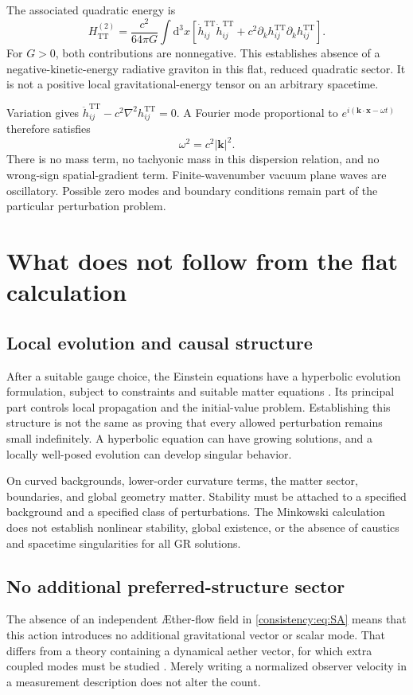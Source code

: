 \documentclass[11pt,oneside]{report}
\newcommand{\Aflow}{\AE{}ther-flow}
\newcommand{\TT}{\mathrm{TT}}
\newcommand{\dd}{\mathrm d}
\theoremstyle{remark}
\numberwithin{definition}{chapter}
\numberwithin{proposition}{chapter}
\numberwithin{remark}{chapter}
\begin{document}
The associated quadratic energy is
\begin{equation}
H_{\TT}^{(2)}=\frac{c^2}{64\pi G}\int\dd^3x\left[
\dot h^{\TT}_{ij}\dot h^{\TT}_{ij}
+c^2\partial_kh^{\TT}_{ij}\partial_kh^{\TT}_{ij}\right].
\end{equation}
For $G>0$, both contributions are nonnegative. This establishes absence of a negative-kinetic-energy radiative graviton in this flat, reduced quadratic sector. It is not a positive local gravitational-energy tensor on an arbitrary spacetime.

Variation gives $\ddot h^{\TT}_{ij}-c^2\nabla^2h^{\TT}_{ij}=0$. A Fourier mode proportional to $e^{i(\mathbf k\cdot\mathbf x-\omega t)}$ therefore satisfies
\begin{equation}
\omega^2=c^2|\mathbf k|^2.
\end{equation}
There is no mass term, no tachyonic mass in this dispersion relation, and no wrong-sign spatial-gradient term. Finite-wavenumber vacuum plane waves are oscillatory. Possible zero modes and boundary conditions remain part of the particular perturbation problem.

\section{What does not follow from the flat calculation}
\subsection{Local evolution and causal structure}
After a suitable gauge choice, the Einstein equations have a hyperbolic evolution formulation, subject to constraints and suitable matter equations \parencite{Gourgoulhon2007}. Its principal part controls local propagation and the initial-value problem. Establishing this structure is not the same as proving that every allowed perturbation remains small indefinitely. A hyperbolic equation can have growing solutions, and a locally well-posed evolution can develop singular behavior.

On curved backgrounds, lower-order curvature terms, the matter sector, boundaries, and global geometry matter. Stability must be attached to a specified background and a specified class of perturbations. The Minkowski calculation does not establish nonlinear stability, global existence, or the absence of caustics and spacetime singularities for all GR solutions.

\subsection{No additional preferred-structure sector}
The absence of an independent \Aflow{} field in \eqref{consistency:eq:SA} means that this action introduces no additional gravitational vector or scalar mode. That differs from a theory containing a dynamical aether vector, for which extra coupled modes must be studied \parencite{JacobsonMattingly2004}. Merely writing a normalized observer velocity in a measurement description does not alter the count.
\end{document}
